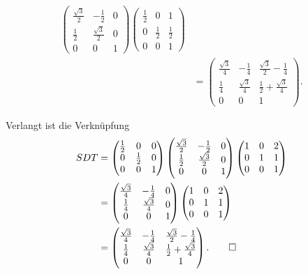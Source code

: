 \begin{loesung}
\begin{teilaufgaben}
\begin{align*}
\begin{pmatrix}
\frac{\sqrt{3}}2 & - \frac12        & 0 \\
\frac12          & \frac{\sqrt{3}}2 & 0 \\
      0          &        0         & 1
\end{pmatrix}
\begin{pmatrix}
\frac12 &     0   & 1 \\
    0   & \frac12 & \frac12 \\
    0   &     0   & 1 
\end{pmatrix}
\\
&=
\begin{pmatrix}
\frac{\sqrt{3}}4 & -\frac14        & \frac{\sqrt{3}}2-\frac14 \\
\frac14          &\frac{\sqrt{3}}4 & \frac12+\frac{\sqrt{3}}4 \\
       0         &        0        & 1
\end{pmatrix}.
\end{align*}
\item
Verlangt ist die Verknüpfung
\begin{align*}
SDT
&=
\begin{pmatrix}
\frac12 &     0   & 0 \\
    0   & \frac12 & 0 \\
    0   &     0   & 1 
\end{pmatrix}
\begin{pmatrix}
\frac{\sqrt{3}}2 & - \frac12        & 0 \\
\frac12          & \frac{\sqrt{3}}2 & 0 \\
      0          &        0         & 1
\end{pmatrix}
\begin{pmatrix}
1&0&2\\
0&1&1\\
0&0&1
\end{pmatrix}
\\
&=
\begin{pmatrix}
\frac{\sqrt{3}}4 & - \frac14        & 0 \\
\frac14          & \frac{\sqrt{3}}4 & 0 \\
      0          &        0         & 1
\end{pmatrix}
\begin{pmatrix}
1&0&2\\
0&1&1\\
0&0&1
\end{pmatrix}
\\
&=
\begin{pmatrix}
\frac{\sqrt{3}}4 & -\frac14         & \frac{\sqrt{3}}2-\frac14         \\
\frac14          & \frac{\sqrt{3}}4 & \frac12+\frac{\sqrt{3}}4 \\
0                & 0                & 1
\end{pmatrix}.
\qedhere
\end{align*}
\end{teilaufgaben}
\end{loesung}


